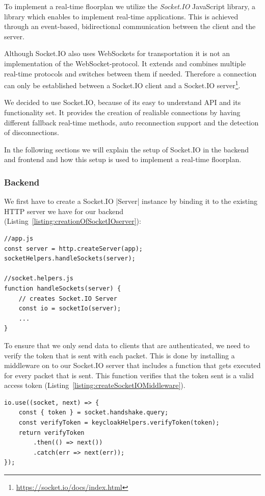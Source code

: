 To implement a real-time floorplan we utilize the \emph{Socket.IO} JavaScript library, a library which enables to implement real-time applications. This is achieved through an event-based, bidirectional communication between the client and the server. 

Although Socket.IO also uses WebSockets for transportation it is not an implementation of the WebSocket-protocol. It extends and combines multiple real-time protocols and switches between them if needed. Therefore a connection can only be established between a Socket.IO client and a Socket.IO server\footnote{\url{https://socket.io/docs/index.html}}.

We decided to use Socket.IO, because of its easy to understand API and its functionality set. It provides the creation of realiable connections by having different fallback real-time methods, auto reconnection support and the detection of disconnections.

In the following sections we will explain the setup of Socket.IO in the backend and frontend and how this setup is used to implement a real-time floorplan.

\subsubsection{Backend}
\label{Backend}

We first have to create a Socket.IO |Server|\cite{socketio:server} instance by binding it to the existing HTTP server we have for our backend (Listing~\ref{listing:creationOfSocketIOserver}):

\begin{lstlisting}[label={listing:creationOfSocketIOserver},caption={Creation of Socket.IO server}]
//app.js
const server = http.createServer(app);
socketHelpers.handleSockets(server);

//socket.helpers.js
function handleSockets(server) {
	// creates Socket.IO Server
    const io = socketIo(server);
    ...
}
\end{lstlisting}

To ensure that we only send data to clients that are authenticated, we need to verify the token that is sent with each packet. This is done by installing a middleware on to our Socket.IO server that includes a function that gets executed for every packet that is sent. This function verifies that the token sent is a valid access token (Listing~\ref{listing:createSocketIOMiddleware}).

\begin{lstlisting}[label={listing:createSocketIOMiddleware},caption={Middleware of Socket.IO server}]
io.use((socket, next) => {
    const { token } = socket.handshake.query;
    const verifyToken = keycloakHelpers.verifyToken(token);
    return verifyToken
        .then(() => next())
        .catch(err => next(err));
});
\end{lstlisting}


